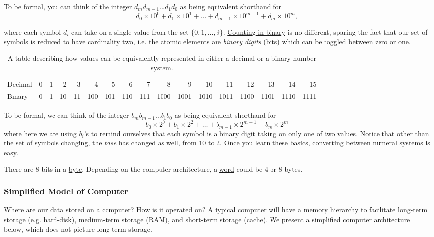 \documentclass[12pt,letterpaper,twoside]{article}
\begin{document}
To be formal, you can think of the integer $d_m
d_{m-1} \ldots d_1 d_0$ as being equivalent shorthand for
\[
  d_0 \times 10^0 + d_1 \times 10^1 + \ldots + d_{m-1} \times 10^{m-1}
  + d_m \times 10^m,
\]

where each symbol $d_i$ can take on a single value from the set $\{0,
1, \ldots, 9\}$.
\href{https://en.wikipedia.org/wiki/Binary_number#Binary_counting}{Counting
  in binary} is no different, sparing the fact that our set of
symbols is reduced to have cardinality two, i.e. the atomic elements are
\href{https://en.wikipedia.org/wiki/Bit}{\emph{binary digits} (bits)}
which can be toggled between zero or one.

\begin{centering}
\begin{table}[h]
  \hspace{-6ex}
\begin{tabular}{l r r r r r r r r r r r r r r r r}
  Decimal & 0 & 1 & 2 & 3 & 4 & 5 & 6 & 7 & 8 & 9 & 10 & 11 & 12 & 13
  & 14 & 15 \\
  Binary & 0 & 1 & 10 & 11 & 100 & 101 & 110 & 111 & 1000 & 1001 &
                                                                   1010
                                                       & 1011 & 1100 &
                                                                       1101
  & 1110 & 1111
\end{tabular}
\caption{A table describing how values can be equivalently represented
  in either a decimal or a
  binary number system.}
\end{table}
\end{centering}

To be formal, we can think of the integer $b_m b_{m-1} \ldots b_1 b_0$
as being equivalent shorthand for
\[
  b_0 \times 2^0 + b_1 \times 2^2 + \ldots + b_{m-1} \times 2^{m-1} +
  b_m \times 2^m
\]
where here we are using $b_i$'s to remind ourselves that each symbol
is a binary digit taking on only one of two values. Notice that other
than the set of symbols changing, the \emph{base} has changed as well,
from 10 to 2. Once you learn these basics, \href{https://en.wikipedia.org/wiki/Binary_number#Conversion_to_and_from_other_numeral_systems}{converting between numeral
systems} is easy.

There are 8 bits in a
\href{https://en.wikipedia.org/wiki/Byte}{byte}. Depending on the
computer architecture, a
\href{https://en.wikipedia.org/wiki/Word_(computer_architecture)}{word}
could be 4 or 8 bytes.

\subsubsection{Simplified Model of Computer}
Where are our data stored on a computer? How is it operated on?
A typical computer will have a memory hierarchy to facilitate
long-term storage (e.g. hard-disk), medium-term storage (RAM), and
short-term storage (cache). We present a simplified computer
architecture below, which does not picture long-term storage.
\end{document}
